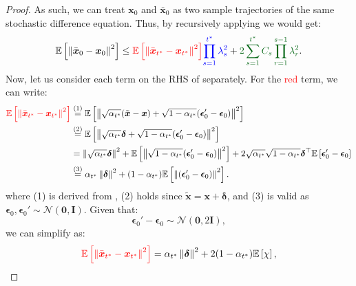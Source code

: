 \documentclass[conference]{IEEEtran}
\theoremstyle{definition}
\theoremstyle{remark}
\theoremstyle{proposition}
\newcommand{\norm}[1]{\left\lVert#1\right\rVert}
\begin{document}
\begin{proof}
    As such, we can treat $\boldsymbol{x}_0$ and $\bar{\boldsymbol{x}}_0$ as two sample trajectories of the same stochastic difference equation.
    Thus, by recursively applying  we would get:
    \begin{equation}\label{eq:contraction_cumulative}
        \mathbb{E}\left[\norm{\bar{\boldsymbol{x}}_{0}-\boldsymbol{x}_{0}}^2\right] \leq \textcolor{red}{\mathbb{E}\left[\norm{\bar{\boldsymbol{x}}_{t^{*}}-\boldsymbol{x}_{t^{*}}}^2\right]} \textcolor{blue}{\prod_{s=1}^{t^{*}}\lambda_{s}^{2}}+ \textcolor{darkgreen}{2 \sum_{s=1}^{t^{*}}C_{s} \prod_{r=1}^{s-1}\lambda_{r}^{2}}.
    \end{equation}
    Now, let us consider each term on the RHS of  separately.
    For the \textcolor{red}{red} term, we can write:
    \begin{align}\label{eq:red_term_1}\nonumber
        \textcolor{red}{\mathbb{E}\left[\norm{\bar{\boldsymbol{x}}_{t^{*}}-\boldsymbol{x}_{t^{*}}}^2\right]} &\stackrel{\mathrm{(1)}}{=} \mathbb{E}\left[\norm{\sqrt{\alpha_{t^{*}}} (\tilde{\boldsymbol{x}}-\boldsymbol{x}) + \sqrt{1 - \alpha_{t^{*}}} (\boldsymbol{\epsilon}_0'-\boldsymbol{\epsilon}_0)}^2\right] \\\nonumber
        &\stackrel{\mathrm{(2)}}{=} \mathbb{E}\left[\norm{\sqrt{\alpha_{t^{*}}} \boldsymbol{\delta} + \sqrt{1 - \alpha_{t^{*}}} (\boldsymbol{\epsilon}_0'-\boldsymbol{\epsilon}_0)}^2\right]\\\nonumber
        &= \norm{\sqrt{\alpha_{t^{*}}} \boldsymbol{\delta}}^2 + \mathbb{E}\left[\norm{\sqrt{1 - \alpha_{t^{*}}} (\boldsymbol{\epsilon}_0'-\boldsymbol{\epsilon}_0)}^2\right] + 2 \sqrt{\alpha_{t^{*}}}\sqrt{1 - \alpha_{t^{*}}} \boldsymbol{\delta}^\top\mathbb{E}\left[\boldsymbol{\epsilon}_0'-\boldsymbol{\epsilon}_0\right]\\
        &\stackrel{\mathrm{(3)}}{=} \alpha_{t^{*}}\norm{\boldsymbol{\delta}}^2 + (1 - \alpha_{t^{*}})\mathbb{E}\left[\norm{(\boldsymbol{\epsilon}_0'-\boldsymbol{\epsilon}_0)}^2\right].
    \end{align}
    where (1) is derived from , (2) holds since $\tilde{\boldsymbol{x}} = \boldsymbol{x} + \boldsymbol{\delta}$, and (3) is valid as $\boldsymbol{\epsilon}_{0}, \boldsymbol{\epsilon}_{0}' \sim \mathcal{N}(\mathbf{0}, \mathbf{I})$.
    Given that:
    $$\boldsymbol{\epsilon}_{0}' - \boldsymbol{\epsilon}_{0} \sim \mathcal{N}(\mathbf{0}, 2\mathbf{I}),$$
    we can simplify  as:
    $$
        \textcolor{red}{\mathbb{E}\left[\norm{\bar{\boldsymbol{x}}_{t^{*}}-\boldsymbol{x}_{t^{*}}}^2\right]} = \alpha_{t^{*}}\norm{\boldsymbol{\delta}}^2 + 2 (1 - \alpha_{t^{*}})\mathbb{E}\left[\chi\right],
$$
\end{proof}
\end{document}
